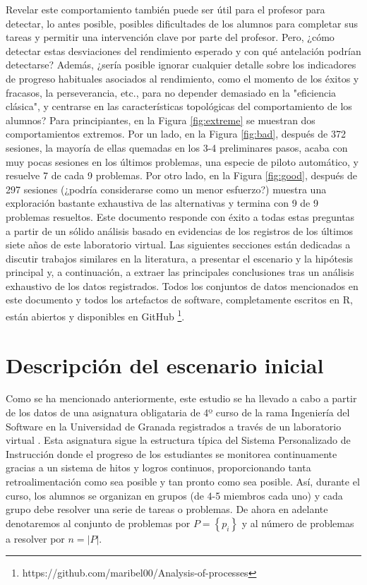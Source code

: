 Revelar este comportamiento también puede ser útil para el profesor para detectar, lo antes posible, posibles dificultades de los alumnos para completar sus tareas y permitir una intervención clave por parte del profesor. Pero, ¿cómo detectar estas desviaciones del rendimiento esperado y con qué antelación podrían detectarse? Además, ¿sería posible ignorar cualquier detalle sobre los indicadores de progreso habituales asociados al rendimiento, como el momento de los éxitos y fracasos, la perseverancia, etc., para no depender demasiado en la "eficiencia clásica", y centrarse en las características topológicas del comportamiento de los alumnos? Para principiantes, en la Figura \ref{fig:extreme} se muestran dos comportamientos extremos. Por un lado, en la Figura \ref{fig:bad}, después de 372 sesiones, la mayoría de ellas quemadas en los 3-4 preliminares pasos, acaba con muy pocas sesiones en los últimos problemas, una especie de piloto automático, y resuelve 7 de cada 9 problemas. Por otro lado, en la Figura \ref{fig:good}, después de 297 sesiones (¿podría considerarse como un menor esfuerzo?) muestra una exploración bastante exhaustiva de las alternativas y termina con 9 de 9 problemas resueltos. Este
documento responde con éxito a todas estas preguntas a partir de un sólido análisis basado en evidencias de los registros de los últimos siete años de este laboratorio virtual. Las siguientes secciones están dedicadas a discutir trabajos similares en la literatura, a presentar el escenario y la hipótesis principal y, a continuación, a extraer las principales conclusiones tras un análisis exhaustivo de los datos registrados. Todos los conjuntos de datos mencionados en este documento y todos los artefactos de software, completamente escritos en R, están abiertos y disponibles en GitHub \footnote{https://github.com/maribel00/Analysis-of-processes}.

\section{Descripción del escenario inicial}

Como se ha mencionado anteriormente, este estudio se ha llevado a cabo a partir de los datos de una asignatura obligataria de 4º curso de la rama Ingeniería del Software en la Universidad de Granada registrados a través de un laboratorio virtual \cite{Vidal_2016}. Esta asignatura sigue la estructura típica del Sistema Personalizado de Instrucción \cite{Keller_1968} donde el progreso de los estudiantes se monitorea continuamente gracias a un sistema de hitos y logros continuos, proporcionando tanta retroalimentación como sea posible y tan pronto como sea posible. Así, durante el curso, los alumnos se organizan en grupos (de 4-5 miembros cada uno) y cada grupo debe resolver una serie de tareas o problemas. De ahora en adelante denotaremos al conjunto de problemas por $P = \left\lbrace p_i \right\rbrace$ y al número de problemas a resolver por $n = |P|$.

